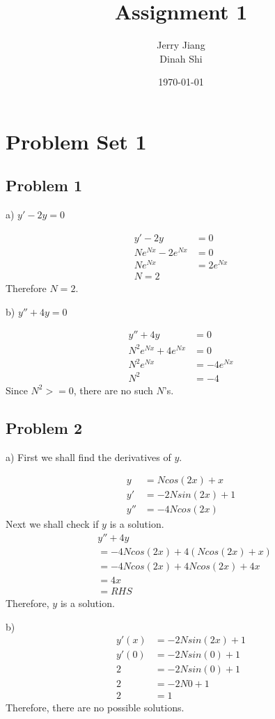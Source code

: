\documentclass[titlepage]{article}
\title{Assignment 1}
\date{\today}
\author{Jerry Jiang\\ Dinah Shi}
\begin{document}
\maketitle

\noindent
\section{Problem Set 1}
\subsection{Problem 1}
a) $y' - 2y = 0$

\begin{align*}
  y' - 2y &= 0
  \\ Ne^{Nx} - 2e^{Nx} &= 0
  \\ Ne^{Nx} &= 2e^{Nx}
  \\ N = 2
\end{align*}
Therefore $N = 2$.

\vspace{1em}
\noindent
b) $y'' + 4y = 0$

\begin{align*}
  y'' + 4y &= 0
  \\ N^2e^{Nx} + 4e^{Nx} &= 0
  \\ N^2e^{Nx} &= -4e^{Nx}
  \\ N^2 &= -4
\end{align*}
Since $N^2 >= 0$, there are no such $N$'s.

\subsection{Problem 2}

a) First we shall find the derivatives of $y$.

\begin{align*}
  y &= Ncos(2x) + x
  \\ y' &= -2Nsin(2x) + 1
  \\ y'' &= -4Ncos(2x)
\end{align*}
Next we shall check if $y$ is a solution.
\begin{align*}
  &y'' + 4y
  \\ &= -4Ncos(2x) + 4(Ncos(2x) + x)
  \\ &= -4Ncos(2x) + 4Ncos(2x) + 4x
  \\ &= 4x
  \\ &= RHS
\end{align*}
Therefore, $y$ is a solution.

\vspace{1em}
\noindent
b)
\begin{align*}
  y'(x) &= -2Nsin(2x) + 1
  \\ y'(0) &= -2Nsin(0) + 1
  \\ 2 &= -2Nsin(0) + 1
  \\ 2 &= -2N0 + 1
  \\ 2 &= 1
\end{align*}
Therefore, there are no possible solutions.
\end{document}

